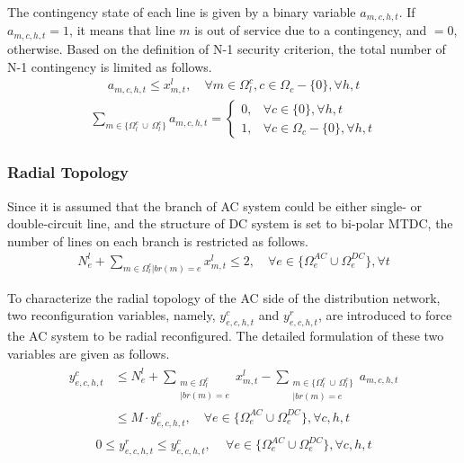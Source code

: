 \documentclass[a4paper,fleqn]{cas-dc}
\begin{document}
The contingency state of each line is given by a binary variable 
$ a_{m,c,h,t} $. If $ a_{m,c,h,t} = 1 $, it means that line $ m $ is out of 
service due to a contingency, and $ = 0 $, otherwise. Based on the definition
of N-1 security criterion, the total number of N-1 contingency is limited as
follows.
\begin{align}
    \label{n_1_loc}
    a_{m,c,h,t} \leq x_{m,t}^{l},
    \quad \forall m \in \Omega_{l}^{c}, c \in \Omega_{c} - \{0\},
    \forall h, t
\end{align}
\begin{align}
    \label{n_1_num}
    \sum_{m \in \{\Omega_{l}^{e} \, \cup \, \Omega_{l}^{c}\}} a_{m,c,h,t} = 
    \begin{cases}
    0, & \forall c \in \{0\},
    \forall  h, t \\
    1, & \forall c \in \Omega_{c} - \{0\},
    \forall h, t
    \end{cases}
\end{align}

\vspace{3mm}

{\color{blue}
\subsubsection{Radial Topology}
}

Since it is assumed that the branch of AC system could be either single- or 
double-circuit line, and the structure of DC system is set to bi-polar MTDC,
the number of lines on each branch is restricted as follows.
\begin{align}
    \label{opr_AC}
    N_{e}^{l} + \sum_{m \in \Omega_{l}^{c} | br(m) = e} x_{m,t}^{l} \leq 2,
    \quad \forall e \in \{\Omega_{e}^{AC} \cup \Omega_{e}^{DC}\},
    \forall t
\end{align}

To characterize the radial topology of the AC side of the distribution network,
two reconfiguration variables, namely, $ y_{e,c,h,t}^{c} $ and 
$ y_{e,c,h,t}^{r} $, are introduced to force the AC system to be radial 
{\color{blue}reconfigured}. The detailed formulation of these two variables are 
given as follows.
\begin{align}
    \label{recon_cap}
    \begin{aligned}
    y_{e,c,h,t}^{c} & \leq N_{e}^{l} +
    \sum_{\substack{m \in \Omega_{l}^{c} \\ | br(m) = e}}
    x_{m,t}^{l} - 
    \sum_{\substack{m \in \{\Omega_{l}^{e} \, \cup \, \Omega_{l}^{c}\} \\ | br(m) = e}}
    a_{m,c,h,t} \\ &
    \leq M \cdot y_{e,c,h,t}^{c}, 
    \quad \forall e \in \{\Omega_{e}^{AC} \cup \Omega_{e}^{DC}\},
    \forall c,h,t
    \end{aligned}
\end{align}
\begin{align}
    \label{recon_net}
    0 \leq y_{e,c,h,t}^{r} \leq y_{e,c,h,t}^{c},
    \quad \, \forall e \in \{\Omega_{e}^{AC} \cup \Omega_{e}^{DC}\},
    \forall c,h,t
\end{align}
\end{document}
